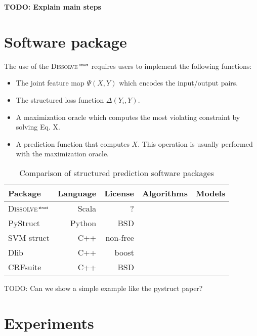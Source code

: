 \documentclass[twoside,11pt]{article}
\newcommand{\algname}{\textsc{Dissolve}$\,^{\textsf{\tiny struct}}$\xspace}
\newcommand{\0}{\mathbf{0}} %
\begin{document}
{\bf TODO: Explain main steps}

\section{Software package}

The use of the \algname requires users to implement the following functions:
\begin{itemize}
\item The joint feature map $\Psi(X,Y)$ which encodes the input/output pairs.
\item The structured loss function $\Delta(Y_i,Y)$.
\item A maximization oracle which computes the most violating constraint by solving Eq. X.
\item A prediction function that computes $X$. This operation is usually performed with the maximization oracle.
\end{itemize}

\begin{table}[h]
\caption{Comparison of structured prediction software packages}
\label{tab:datasets}
   \begin{center}
      \begin{tabular}{l| r | %
      r | r | r}
       \vspace{.25em}
    {\small\textbf{Package}} & {\small\textbf{Language}} & %
    {\small\textbf{License}} & {\small\textbf{Algorithms}} & {\small\textbf{Models}}\\
    \hline
    \algname & Scala & ?\\
    PyStruct & Python & BSD\\
	SVM struct & C++ & non-free \\
	Dlib & C++ & boost \\
	CRFsuite & C++ & BSD \\
      \end{tabular}
   \end{center}\vspace{-2mm}
\end{table}

TODO: Can we show a simple example like the pystruct paper?

\section{Experiments}
\end{document}
